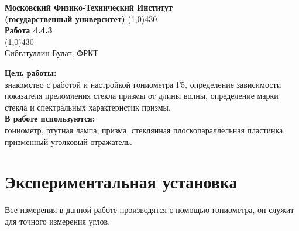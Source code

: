 \documentclass[a4paper, 12pt]{article}%
\begin{document}
\begin{titlepage}

\begin{center}
\large\textbf{Московский Физико-Технический Институт}\\
\large\textbf{(государственный университет)}
\vfill
\line(1,0){430}\\[1mm]
\huge\textbf{Работа 4.4.3}\\
\line(1,0){430}\\[1mm]
\vfill
\large Сибгатуллин Булат, ФРКТ\\
\end{center}

\end{titlepage}
\noindent \textbf{Цель работы:}\\
\indent знакомство с работой и настройкой гониометра Г5, определение зависимости показателя преломления стекла призмы от длины волны, определение марки стекла и спектральных характеристик призмы.\\
\noindent \textbf{В работе используются:}\\
\indent гониометр, ртутная лампа, призма, стеклянная плоскопараллельная пластинка, призменный уголковый отражатель.

\section*{Экспериментальная установка}

Все измерения в данной работе производятся с помощью гониометра, он служит для точного измерения углов.
\end{document}

